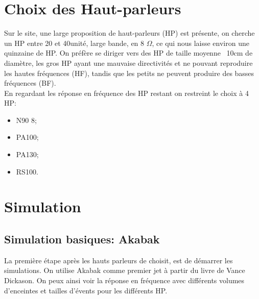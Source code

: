 \documentclass[a4paper,english]{report}
\begin{document}
			\section{Choix des Haut-parleurs}
			Sur le site, une large proposition de haut-parleurs (HP) est présente, on cherche un HP entre 20 et 40\texteuro unité, large bande, en 8 $\Omega$, ce qui nous laisse environ une quinzaine de HP.  On préfère se diriger vers des HP de taille moyenne  ~10cm de diamètre, les gros HP ayant une mauvaise directivités et ne pouvant reproduire les hautes fréquences (HF), tandis que les petits ne peuvent produire des basses fréquences (BF).\\
			En regardant les réponse en fréquence des HP restant on restreint le choix à 4 HP:
			\begin{itemize}
				\item N90 8;
				\item PA100;
				\item PA130;
				\item RS100.
			\end{itemize}
			
			\section{Simulation}
			\subsection{Simulation basiques: Akabak}
			La première étape après les hauts parleurs de choisit, est de démarrer les simulations. On utilise Akabak comme premier jet à partir du livre de Vance Dickason. On peux ainsi voir la réponse en fréquence avec différents volumes d'enceintes et tailles d'évents pour les différents HP.\\ 
			
\end{document}
